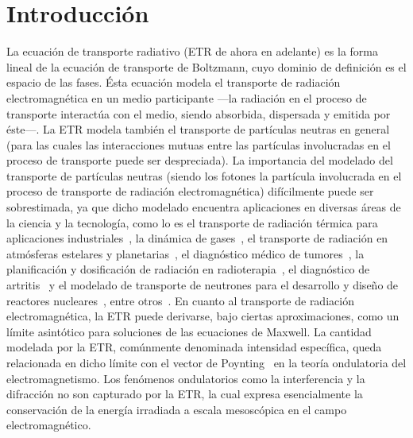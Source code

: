 \pagestyle{fancy}
\chapter{Introducción}
\lhead{\thepage}
\vspace{0.01\textheight}
\pagebreak

La ecuación de transporte radiativo (ETR de ahora en adelante) es la forma lineal de la ecuación de transporte de Boltzmann, 
cuyo dominio de definición es el espacio de las fases. Ésta ecuación modela el transporte 
de radiación electromagnética en un medio participante ---la radiación en el proceso de transporte 
interactúa con el medio, siendo absorbida, dispersada y emitida por éste---. La ETR modela también el transporte de partículas neutras en
 general (para las cuales las interacciones mutuas entre las partículas involucradas 
 en el proceso de transporte puede ser despreciada). La importancia del modelado del transporte de 
 partículas neutras (siendo los fotones la partícula involucrada en el proceso de transporte de 
 radiación electromagnética) difícilmente puede ser sobrestimada, ya que dicho modelado encuentra aplicaciones en diversas
 áreas de la ciencia y la tecnología, como lo es el transporte de radiación 
 térmica para aplicaciones industriales~\cite{Howell2010, Thynell1998}, la dinámica de 
 gases~\cite{Duderstadt1979}, el transporte de radiación en atmósferas estelares y 
 planetarias~\cite{Qin2015, Dymond1997, Chandrasekhar1960}, el diagnóstico médico de 
 tumores~\cite{Zhu2005, Zhu2010, Fujii2016b}, la planificación y dosificación 
 de radiación en radioterapia~\cite{Vassiliev2010,Bedford2019}, el diagnóstico de artritis~\cite{Klose2002, Netz2001} 
 y el modelado de transporte de neutrones para el desarrollo 
 y diseño de reactores nucleares~\cite{Larsen2006, Sanchez1982, Anli2006}, entre otros~\cite {Mishchenko1999, Prasher2003}. 
 En cuanto al transporte de radiación electromagnética, la ETR puede derivarse, bajo ciertas aproximaciones, como un límite asintótico 
 para soluciones de las ecuaciones de Maxwell. La cantidad modelada por la ETR, comúnmente denominada 
 intensidad específica, queda relacionada en dicho límite con el vector de Poynting~\cite{Mishchenko2002, Ripoll2011} 
 en la teoría ondulatoria del electromagnetismo. Los fenómenos ondulatorios como la interferencia y la difracción no son
 capturado por la ETR, la cual expresa esencialmente la conservación de la
 energía irradiada a escala mesoscópica en el campo electromagnético.

